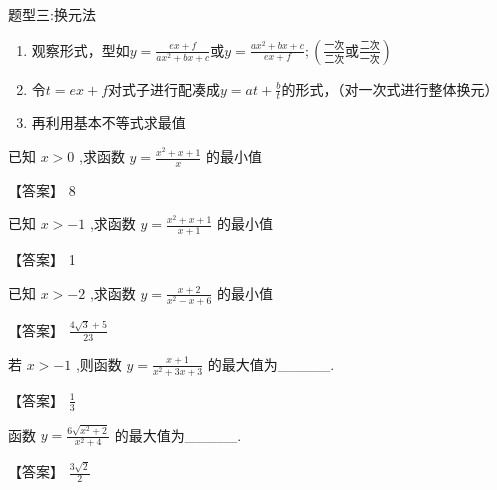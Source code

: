 \documentclass[11pt,a4paper]{article}
\begin{document}
\begin{tcolorbox} 
    \centering
    题型三:换元法
    \tcblower %
    \begin{enumerate}
        \item 观察形式，型如$\displaystyle y=\frac{ex+f}{ax^2+bx+c}$或$\displaystyle y=\frac{ax^2+bx+c}{ex+f};(\frac{\text{一次}}{\text{二次}}\text{或}\frac{\text{二次}}{\text{一次}})$
        \item 令$t=ex+f$对式子进行配凑成$\displaystyle y=at+\frac{b}{t}$的形式，（对一次式进行整体换元）
        \item 再利用基本不等式求最值
    \end{enumerate}
\end{tcolorbox}

\begin{problem} 
已知 \(\displaystyle x > 0\) ,求函数 \(\displaystyle y = \frac{{x}^{2} + x + 1}{x}\) 的最小值
\begin{jiexi}[25]
【答案】 8


\end{jiexi}
\end{problem}
\begin{problem} 
已知 \(\displaystyle x >  - 1\) ,求函数 \(\displaystyle y = \frac{{x}^{2} + x + 1}{x + 1}\) 的最小值
\begin{jiexi}[25]
【答案】 1


\end{jiexi}
\end{problem}
\begin{problem} 
已知 \(\displaystyle x >  - 2\) ,求函数 \(\displaystyle y = \frac{x + 2}{{x}^{2} - x + 6}\) 的最小值
\begin{jiexi}[25]
【答案】 \(\displaystyle \frac{4\sqrt{3} + 5}{23}\)


\end{jiexi}
\end{problem}
\begin{problem} 
若 \(\displaystyle x >  - 1\) ,则函数 \(\displaystyle y = \frac{x + 1}{{x}^{2} + {3x} + 3}\) 的最大值为\_\_\_\_\_.
\begin{jiexi}
【答案】 \(\displaystyle \frac{1}{3}\)


\end{jiexi}
\end{problem}
\begin{problem} 
函数 \(\displaystyle y = \frac{6\sqrt{{x}^{2} + 2}}{{x}^{2} + 4}\) 的最大值为\_\_\_\_\_.
\begin{jiexi}
【答案】 \(\displaystyle \frac{3\sqrt{2}}{2}\)


\end{jiexi}
\end{problem}
\end{document}
